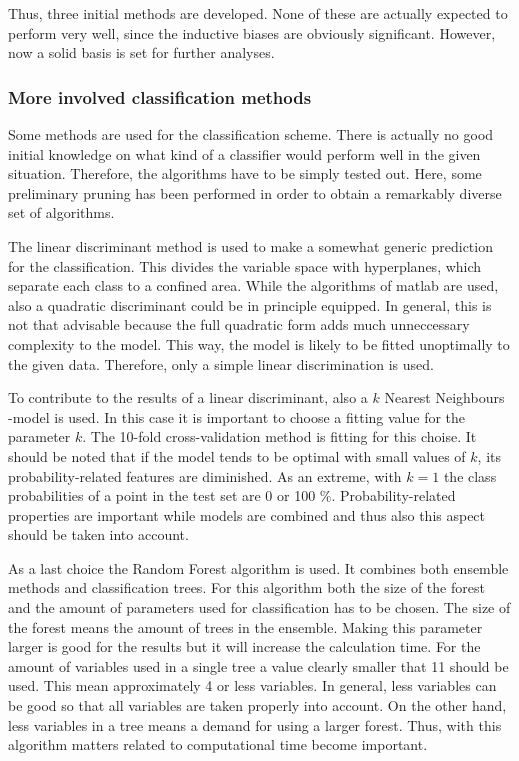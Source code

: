 \documentclass[twoside]{article}
\begin{document}
\begin{multicols}{2}
Thus, three initial methods are developed. None of these are actually expected to perform very well, since the inductive
biases are obviously significant. However, now a solid basis is set for further analyses.

\subsubsection{More involved classification methods}

Some methods are used for the classification scheme. There is actually no good initial knowledge on what kind of a classifier
would perform well in the given situation. Therefore, the algorithms have to be simply tested out. Here, some preliminary 
pruning has been performed in order to obtain a remarkably diverse set of algorithms.

The linear discriminant method is used to make a somewhat generic prediction for the classification. This divides the variable space
with hyperplanes, which separate each class to a confined area. While the algorithms of matlab are used, also a quadratic discriminant
could be in principle equipped. In general, this is not that advisable because the full quadratic form adds much unneccessary complexity
to the model. This way, the model is likely to be fitted unoptimally to the given data. Therefore, only a simple linear discrimination is used.

To contribute to the results of a linear discriminant, also a $k$ Nearest Neighbours -model is used. In this case it is important to choose
a fitting value for the parameter $k$. The 10-fold cross-validation method is fitting for this choise. It should be noted that if the model
tends to be optimal with small values of $k$, its probability-related features are diminished. As an extreme, with $k=1$ the class probabilities
of a point in the test set are 0 or 100 $\%$. Probability-related properties are important while models are combined and thus also this aspect
should be taken into account.

As a last choice the Random Forest algorithm is used. It combines both ensemble methods and classification trees. For this algorithm both the size
of the forest and the amount of parameters used for classification has to be chosen. The size of the forest means the amount of trees in the ensemble.
Making this parameter larger is good for the results but it will increase the calculation time. For the amount of variables used in a single tree a
value clearly smaller that 11 should be used. This mean approximately 4 or less variables. In general, less variables can be good so that
all variables are taken properly into account. On the other hand, less variables in a tree means a demand for using a larger forest. Thus,
with this algorithm matters related to computational time become important.


\end{multicols}
\end{document}
